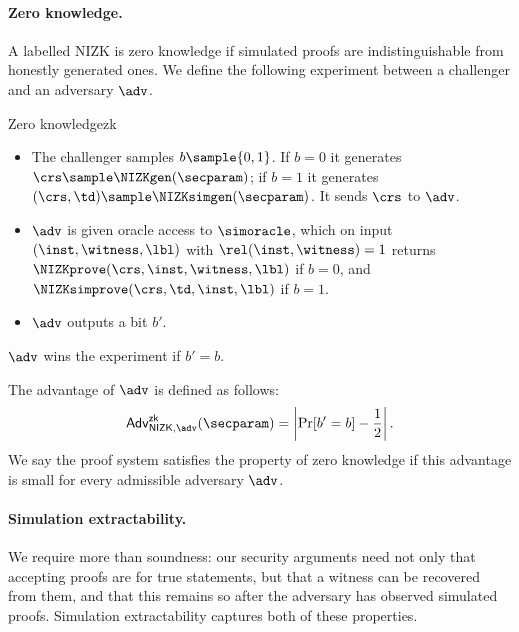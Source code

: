 \paragraph{Zero knowledge.} A labelled NIZK is zero knowledge if simulated
proofs are indistinguishable from honestly generated ones.  We define the
following experiment between a challenger and an adversary $\adv$.

\begin{experimentbox}{Zero knowledge}{zk}

  \begin{itemize}

    \item The challenger samples $b \sample \{0,1\}$.  If $b = 0$ it generates
      $\crs \sample \NIZKgen(\secparam)$; if $b = 1$ it generates $(\crs, \td)
      \sample \NIZKsimgen(\secparam)$.  It sends $\crs$ to $\adv$.

    \item $\adv$ is given oracle access to $\simoracle$, which on input
      $(\inst, \witness, \lbl)$ with $\rel(\inst, \witness) = 1$ returns
      $\NIZKprove(\crs, \inst, \witness, \lbl)$ if $b = 0$, and
      $\NIZKsimprove(\crs, \td, \inst, \lbl)$ if $b = 1$.

    \item $\adv$ outputs a bit $b'$.

  \end{itemize}

  $\adv$ wins the experiment if $b' = b$.

\end{experimentbox}

The advantage of $\adv$ is defined as follows:
%
\begin{equation*}
%
  \mathsf{Adv}^{\mathsf{zk}}_{\mathsf{NIZK}, \adv}(\secparam) = \left| \Pr[b' =
  b] - \frac{1}{2} \right|.
%
\end{equation*}
%
We say the proof system satisfies the property of zero knowledge if this
advantage is small for every admissible adversary $\adv$.

\paragraph{Simulation extractability.} We require more than soundness: our
security arguments need not only that accepting proofs are for true statements,
but that a witness can be recovered from them, and that this remains so after
the adversary has observed simulated proofs.  Simulation extractability
captures both of these properties.

